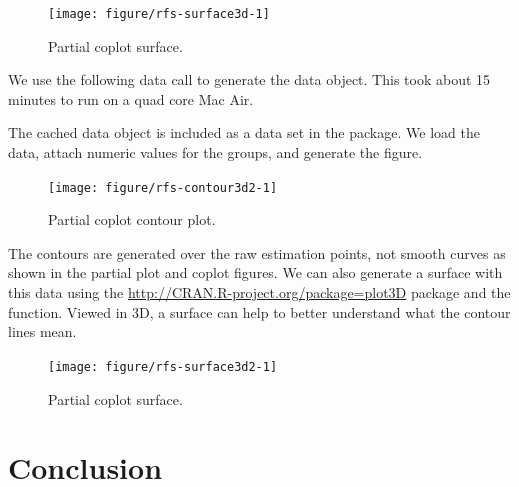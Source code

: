 \documentclass[nojss]{jss}\usepackage[]{graphicx}\usepackage[]{color}
\begin{document}
\begin{Schunk}
\begin{figure}[!htpb]

{\centering \texttt{[image: figure/rfs-surface3d-1]} 

}

\caption[Partial coplot surface]{Partial coplot surface.\label{fig:surface3d}}
\end{figure}
\end{Schunk}





We use the following data call to generate the  data object. This took about 15 minutes to run on a quad core Mac Air.



The cached  data object is included as a data set in the  package. We load the data, attach numeric values for the  groups, and generate the figure.

\begin{Schunk}
\begin{figure}[!htpb]

{\centering \texttt{[image: figure/rfs-contour3d2-1]} 

}

\caption[Partial coplot contour plot]{Partial coplot contour plot.\label{fig:contour3d2}}
\end{figure}
\end{Schunk}

The contours are generated over the raw  estimation points, not smooth curves as shown in the partial plot and coplot figures. We can also generate a surface with this data using the  \url{http://CRAN.R-project.org/package=plot3D} package and the  function. Viewed in 3D, a surface can help to better understand what the contour lines mean. 

\begin{Schunk}
\begin{figure}[!htpb]

{\centering \texttt{[image: figure/rfs-surface3d2-1]} 

}

\caption[Partial coplot surface]{Partial coplot surface.\label{fig:surface3d2}}
\end{figure}
\end{Schunk}

\section{Conclusion}

\appendix


\end{document}
